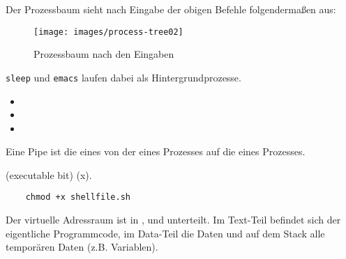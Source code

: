 \begin{answer}
  Der Prozessbaum sieht nach Eingabe der obigen Befehle folgendermaßen aus:
  \begin{figure}[H]
    \caption{Prozessbaum nach den Eingaben}
    \centering
    \texttt{[image: images/process-tree02]}
  \end{figure}
  \texttt{sleep} und \texttt{emacs} laufen dabei als Hintergrundprozesse.
\end{answer}


\begin{answer}
  \begin{itemize}
  \item {}
  \item {}
  \item {}
  \end{itemize}

\end{answer}

\begin{answer}
  Eine Pipe ist die  eines  von der  eines Prozesses auf die  eines Prozesses.
\end{answer}

\begin{answer}
   (executable bit) (x). \\

  \begin{lstlisting}
    chmod +x shellfile.sh
  \end{lstlisting}

\end{answer}

\begin{answer}
  Der virtuelle Adressraum ist in ,  und  unterteilt. Im Text-Teil befindet sich
  der eigentliche Programmcode, im Data-Teil die Daten und auf dem Stack alle temporären
  Daten (z.B. Variablen).
\end{answer}

